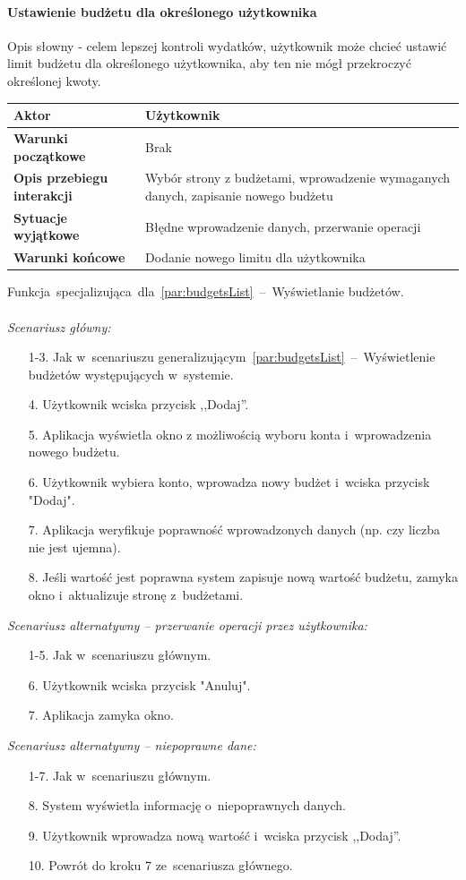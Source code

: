\paragraph{Ustawienie budżetu dla określonego użytkownika\newline}
\label{par:userBudget}
Opis słowny - celem lepszej kontroli wydatków, użytkownik może chcieć ustawić limit
budżetu dla określonego użytkownika, aby ten nie mógł przekroczyć określonej kwoty.
\begin{longtable}{|p{5cm}|p{7cm}|}
 	\hline
	\textbf{Aktor} & Użytkownik \\
	\hline
	\textbf{Warunki początkowe} & Brak
	\\
	\hline
	\textbf{Opis przebiegu interakcji} & Wybór strony z budżetami, wprowadzenie wymaganych danych,
	zapisanie nowego budżetu
	\\
	\hline
	\textbf{Sytuacje wyjątkowe} & Błędne wprowadzenie danych, przerwanie operacji
	\\
	\hline
	\textbf{Warunki końcowe} & Dodanie nowego limitu dla użytkownika
	\\
	\hline
 \end{longtable}
Funkcja~specjalizująca~dla~\ref{par:budgetsList}~--~Wyświetlanie budżetów.\\\\
\textit{Scenariusz główny:}
\begin{enumerate}
  \item[1-3.] Jak w~scenariuszu generalizującym~\ref{par:budgetsList}~--~Wyświetlenie budżetów występujących w~systemie.
  \item[4.] Użytkownik wciska przycisk ,,Dodaj''.
  \item[5.] Aplikacja wyświetla okno z możliwością wyboru konta i~wprowadzenia nowego budżetu.
  \item[6.] Użytkownik wybiera konto, wprowadza nowy budżet i~wciska przycisk "Dodaj".
  \item[7.] Aplikacja weryfikuje poprawność wprowadzonych danych (np. czy liczba nie jest ujemna).
  \item[8.] Jeśli wartość jest poprawna system zapisuje nową wartość budżetu, zamyka okno i~aktualizuje stronę z~budżetami.
\end{enumerate}
\textit{Scenariusz alternatywny -- przerwanie operacji przez użytkownika:}
\begin{enumerate}
  \item[1-5.] Jak w~scenariuszu głównym.
  \item[6.] Użytkownik wciska przycisk "Anuluj".
  \item[7.] Aplikacja zamyka okno.
\end{enumerate}
\textit{Scenariusz alternatywny -- niepoprawne dane:}
\begin{enumerate}
  \item[1-7.] Jak w~scenariuszu głównym.
  \item[8.] System wyświetla informację o~niepoprawnych danych.
  \item[9.] Użytkownik wprowadza nową wartość i~wciska przycisk ,,Dodaj''.
  \item[10.] Powrót do kroku 7 ze~scenariusza głównego.
\end{enumerate}

